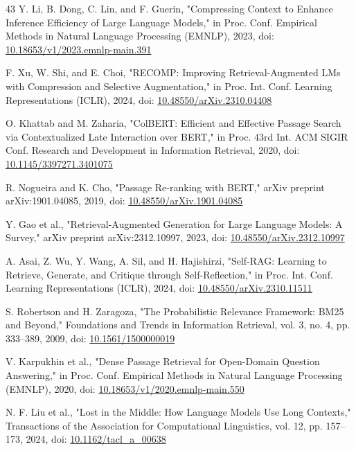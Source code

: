 \begin{thebibliography}{43}
 Y. Li, B. Dong, C. Lin, and F. Guerin, "Compressing Context to Enhance Inference Efficiency of Large Language Models," in Proc. Conf. Empirical Methods in Natural Language Processing (EMNLP), 2023, doi: \href{https://doi.org/10.18653/v1/2023.emnlp-main.391}{10.18653/v1/2023.emnlp-main.391}

 F. Xu, W. Shi, and E. Choi, "RECOMP: Improving Retrieval-Augmented LMs with Compression and Selective Augmentation," in Proc. Int. Conf. Learning Representations (ICLR), 2024, doi: \href{https://doi.org/10.48550/arXiv.2310.04408}{10.48550/arXiv.2310.04408}

 O. Khattab and M. Zaharia, "ColBERT: Efficient and Effective Passage Search via Contextualized Late Interaction over BERT," in Proc. 43rd Int. ACM SIGIR Conf. Research and Development in Information Retrieval, 2020, doi: \href{https://doi.org/10.1145/3397271.3401075}{10.1145/3397271.3401075}

 R. Nogueira and K. Cho, "Passage Re-ranking with BERT," arXiv preprint arXiv:1901.04085, 2019, doi: \href{https://doi.org/10.48550/arXiv.1901.04085}{10.48550/arXiv.1901.04085}

 Y. Gao et al., "Retrieval-Augmented Generation for Large Language Models: A Survey," arXiv preprint arXiv:2312.10997, 2023, doi: \href{https://doi.org/10.48550/arXiv.2312.10997}{10.48550/arXiv.2312.10997}

 A. Asai, Z. Wu, Y. Wang, A. Sil, and H. Hajishirzi, "Self-RAG: Learning to Retrieve, Generate, and Critique through Self-Reflection," in Proc. Int. Conf. Learning Representations (ICLR), 2024, doi: \href{https://doi.org/10.48550/arXiv.2310.11511}{10.48550/arXiv.2310.11511}

 S. Robertson and H. Zaragoza, "The Probabilistic Relevance Framework: BM25 and Beyond," Foundations and Trends in Information Retrieval, vol. 3, no. 4, pp. 333--389, 2009, doi: \href{https://doi.org/10.1561/1500000019}{10.1561/1500000019}

 V. Karpukhin et al., "Dense Passage Retrieval for Open-Domain Question Answering," in Proc. Conf. Empirical Methods in Natural Language Processing (EMNLP), 2020, doi: \href{https://doi.org/10.18653/v1/2020.emnlp-main.550}{10.18653/v1/2020.emnlp-main.550}

 N. F. Liu et al., "Lost in the Middle: How Language Models Use Long Contexts," Transactions of the Association for Computational Linguistics, vol. 12, pp. 157--173, 2024, doi: \href{https://doi.org/10.1162/tacl\_a\_00638}{10.1162/tacl\_a\_00638}


\end{thebibliography}
